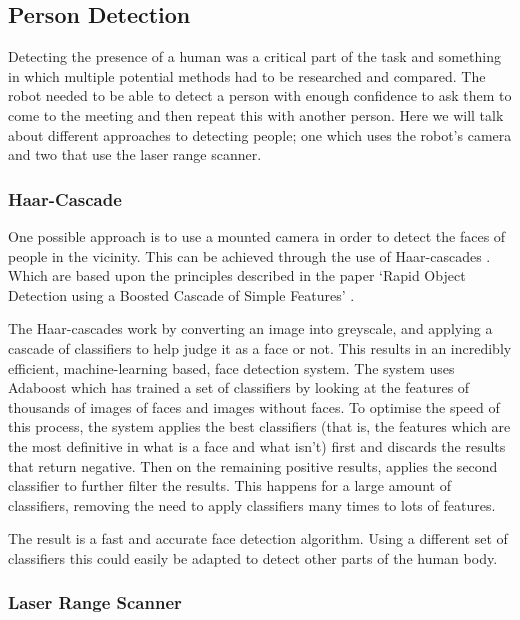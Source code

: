 \subsection{Person Detection}

Detecting the presence of a human was a critical part of the task and something in which multiple potential methods had to be researched and compared. The robot needed to be able to detect a person with enough confidence to ask them to come to the meeting and then repeat this with another person. Here we will talk about different approaches to detecting people; one which uses the robot’s camera and two that use the laser range scanner.

\subsubsection{Haar-Cascade}

One possible approach is to use a mounted camera in order to detect the faces of people in the vicinity. This can be achieved through the use of Haar-cascades \parencite{haar}. Which are based upon the principles described in the paper ‘Rapid Object Detection using a Boosted Cascade of Simple Features’ \parencite{990517}. 

The Haar-cascades work by converting an image into greyscale, and applying a cascade of classifiers to help judge it as a face or not. This results in an incredibly efficient, machine-learning based, face detection system. The system uses Adaboost which has trained a set of classifiers by looking at the features of thousands of images of faces and images without faces. To optimise the speed of this process, the system applies the best classifiers (that is, the features which are the most definitive in what is a face and what isn’t) first and discards the results that return negative. Then on the remaining positive results, applies the second classifier to further filter the results. This happens for a large amount of classifiers, removing the need to apply classifiers many times to lots of features. 

The result is a fast and accurate face detection algorithm. Using a different set of classifiers this could easily be adapted to detect other parts of the human body.

\subsubsection{Laser Range Scanner}

